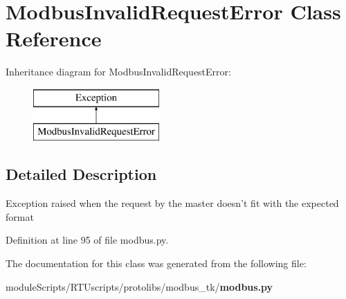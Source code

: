 \section{Modbus\+Invalid\+Request\+Error Class Reference}
\label{classprotolibs_1_1modbus__tk_1_1modbus_1_1_modbus_invalid_request_error}
Inheritance diagram for Modbus\+Invalid\+Request\+Error\+:\begin{figure}[H]
\begin{center}
\leavevmode
\includegraphics[height=2.000000cm]{classprotolibs_1_1modbus__tk_1_1modbus_1_1_modbus_invalid_request_error}
\end{center}
\end{figure}


\subsection{Detailed Description}
\begin{DoxyVerb}Exception raised when the request by the master doesn't fit 
with the expected format
\end{DoxyVerb}
 

Definition at line 95 of file modbus.\+py.



The documentation for this class was generated from the following file\+:\begin{DoxyCompactItemize}
\item 
module\+Scripts/\+R\+T\+Uscripts/protolibs/modbus\+\_\+tk/{\bf modbus.\+py}\end{DoxyCompactItemize}
